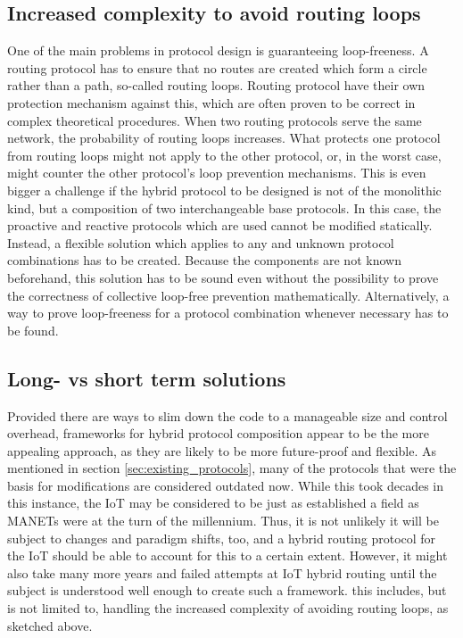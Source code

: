 \documentclass[a4paper,10pt]{scrartcl}
\begin{document}
\subsection{Increased complexity to avoid routing loops}
\label{subsec:routing_loops}
One of the main problems in protocol design is guaranteeing loop-freeness. A routing protocol has to ensure that no routes are created which form a circle rather than a path, so-called routing loops. Routing protocol have their own protection mechanism against this, which are often proven to be correct in complex theoretical procedures. When two routing protocols serve the same network, the probability of routing loops increases. What protects one protocol from routing loops might not apply to the other protocol, or, in the worst case, might counter the other protocol's loop prevention mechanisms. This is even bigger a challenge if the hybrid protocol to be designed is not of the monolithic kind, but a composition of two interchangeable base protocols. In this case, the proactive and reactive protocols which are used cannot be modified statically. Instead, a flexible solution which applies to any and unknown protocol combinations has to be created. Because the components are not known beforehand, this solution has to be sound even without the possibility to prove the correctness of collective loop-free prevention mathematically. Alternatively, a way to prove loop-freeness for a protocol combination whenever necessary has to be found.\\

\subsection{Long- vs short term solutions}
\label{subsec:longterm}
Provided there are ways to slim down the code to a manageable size and control overhead, frameworks for hybrid protocol composition appear to be the more appealing approach, as they are likely to be more future-proof and flexible. As mentioned in section \ref{sec:existing_protocols}, many of the protocols that were the basis for modifications are considered outdated now. While this took decades in this instance, the IoT may be considered to be just as established a field as MANETs were at the turn of the millennium. Thus, it is not unlikely it will be subject to changes and paradigm shifts, too, and a hybrid routing protocol for the IoT should be able to account for this to a certain extent. However, it might also take many more years and failed attempts at IoT hybrid routing until the subject is understood well enough to create such a framework. this includes, but is not limited to, handling the increased complexity of avoiding routing loops, as sketched above.\\
\end{document}
